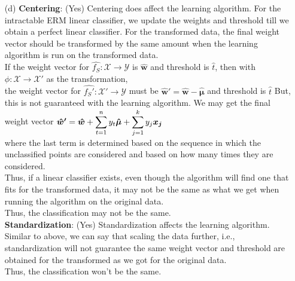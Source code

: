 \documentclass[fleqn]{article}
\begin{document}
\begin{itemize}
        \item[(d)]
		\textbf{Centering}: (Yes) Centering does affect the learning algorithm.
		For the intractable ERM linear classifier, we update the weights and threshold till we obtain a perfect linear classifier.
		For the transformed data, the final weight vector should be transformed by the same amount when the learning algorithm
		is run on the transformed data. \\
		If the weight vector for $\hat{f_S}: \mathcal{X} \rightarrow \mathcal{Y}$ 
		is $\bm{\hat{w}}$ and threshold is $\hat{t}$, then with $\phi: \mathcal{X} \rightarrow \mathcal{X'}$ as the transformation, \\
		the weight vector for $\hat{f_S'}: \mathcal{X'} \rightarrow \mathcal{Y}$ 
		must be $\bm{\hat{w}'} = \bm{\hat{w}} - \bm{\hat{\mu}}$ and threshold is $\hat{t}$
		But, this is not guaranteed with the learning algorithm.
		We may get the final weight vector $\bm{\hat{w}'} = \bm{\hat{w}} 
						+ \smashoperator{\sum_{t = 1}^{n}} y_t \bm{\hat{\mu}}
						+ \smashoperator{\sum_{j = 1}^{k}} y_j \bm{x_j} $\\
		where the last term is determined based on the sequence in which the unclassified points are considered
		and based on how many times they are considered. \\
		Thus, if a linear classifier exists, even though the algorithm will find one that fits for the transformed data,
		it may not be the same as what we get when running the algorithm on the original data.\\
		Thus, the classification may not be the same.\\

		\textbf{Standardization}: (Yes) Standardization affects the learning algorithm.
		Similar to above, we can say that scaling the data further, i.e., standardization will not guarantee the
		same weight vector and threshold are obtained for the transformed as we got for the original data.\\
		Thus, the classification won't be the same.\\

\end{itemize}
\end{document}
